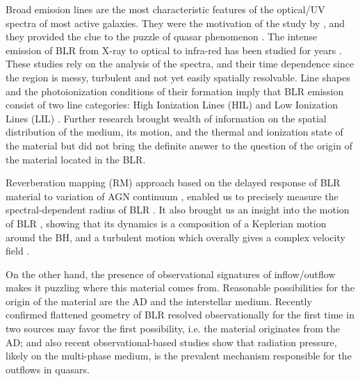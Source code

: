 \documentclass[twocolumn]{aastex62}
\begin{document}
Broad emission lines are the most characteristic features of the optical/UV spectra of most active galaxies. They were the motivation of the study by \citet{seyfert1943}, and they provided the clue to the puzzle of quasar phenomenon \citep{schmidt1963}. The intense emission of BLR from X-ray to optical to infra-red has been studied for years \citep{Boroson1992, Lawrence1997, Sulentic2000, Reeves2000, Gaskell2009, Le2019, Raimundo2020}. These studies rely on the analysis of the spectra, and their time dependence since the region is messy, turbulent and not yet easily spatially resolvable. Line shapes and the photoionization conditions of their formation imply that BLR emission consist of two line categories: High Ionization Lines (HIL) and Low Ionization Lines (LIL) \citep{CollinSouffrin1988}.
Further research brought wealth of information on the spatial distribution of the medium, its motion, and the thermal and ionization state of the material \citep[for a detailed review, see][]{netzer2013} but did not bring the definite answer to the question of the origin of the material located in the BLR.

Reverberation mapping (RM) approach based on the delayed response of BLR material to variation of AGN continuum \citep{Blandford1982, Peterson1993}, enabled us to precisely measure the spectral-dependent radius of BLR \citep{Wandel1999}. It also brought us an insight into the motion of BLR \citep{Peterson1998}, showing that its dynamics is a composition of a Keplerian motion around the BH, and a turbulent motion which overally gives a complex velocity field \citep{Shapovalova2010, Grier2013}.

On the other hand, the presence of observational signatures of inflow/outflow \citep[e.g.][]{Brotherton1994, done1996} makes it puzzling where this material comes from. Reasonable possibilities for the origin of the material are the AD and the interstellar medium. 
Recently confirmed flattened geometry of BLR resolved observationally for the first time in two sources \citep{GravityColl2018,GRAVITY2021} may favor the first possibility, i.e. the material originates from the AD; and also recent observational-based studies \citep{ribas2019a, ribas2019b, leftley2019} show that radiation pressure, likely on the multi-phase medium, is the prevalent mechanism responsible for the outflows in quasars.
\end{document}

